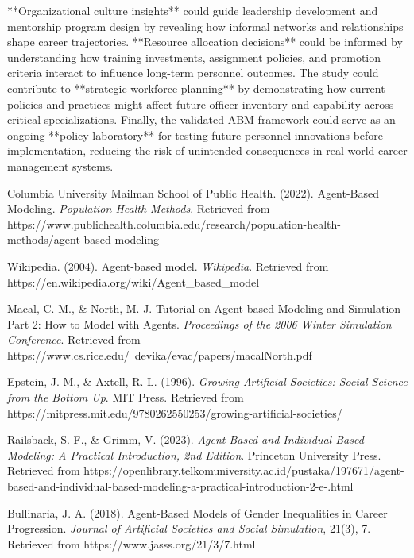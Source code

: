 \documentclass[main.tex]{subfiles}
\begin{document}
**Organizational culture insights** could guide leadership development and mentorship program design by revealing how informal networks and relationships shape career trajectories. **Resource allocation decisions** could be informed by understanding how training investments, assignment policies, and promotion criteria interact to influence long-term personnel outcomes. The study could contribute to **strategic workforce planning** by demonstrating how current policies and practices might affect future officer inventory and capability across critical specializations. Finally, the validated ABM framework could serve as an ongoing **policy laboratory** for testing future personnel innovations before implementation, reducing the risk of unintended consequences in real-world career management systems.

\begin{thebibliography}{20}

Columbia University Mailman School of Public Health. (2022). Agent-Based Modeling. \textit{Population Health Methods}. Retrieved from https://www.publichealth.columbia.edu/research/population-health-methods/agent-based-modeling

Wikipedia. (2004). Agent-based model. \textit{Wikipedia}. Retrieved from https://en.wikipedia.org/wiki/Agent\_based\_model

Macal, C. M., \& North, M. J. Tutorial on Agent-based Modeling and Simulation Part 2: How to Model with Agents. \textit{Proceedings of the 2006 Winter Simulation Conference}. Retrieved from https://www.cs.rice.edu/~devika/evac/papers/macalNorth.pdf

Epstein, J. M., \& Axtell, R. L. (1996). \textit{Growing Artificial Societies: Social Science from the Bottom Up}. MIT Press. Retrieved from https://mitpress.mit.edu/9780262550253/growing-artificial-societies/

Railsback, S. F., \& Grimm, V. (2023). \textit{Agent-Based and Individual-Based Modeling: A Practical Introduction, 2nd Edition}. Princeton University Press. Retrieved from https://openlibrary.telkomuniversity.ac.id/pustaka/197671/agent-based-and-individual-based-modeling-a-practical-introduction-2-e-.html

Bullinaria, J. A. (2018). Agent-Based Models of Gender Inequalities in Career Progression. \textit{Journal of Artificial Societies and Social Simulation}, 21(3), 7. Retrieved from https://www.jasss.org/21/3/7.html


\end{thebibliography}
\end{document}
